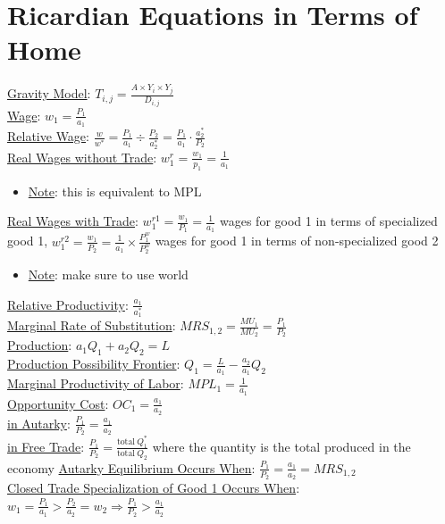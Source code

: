\documentclass{article}
\begin{document}
\section{Ricardian Equations in Terms of Home}
\underline{Gravity Model}: $T_{i,j} = \frac{A \times Y_{i} \times Y_{j}}{D_{i,j}}$ \\
\underline{Wage}: $w_{1} = \frac{P_{1}}{a_{1}}$ \\
\underline{Relative Wage}: $\frac{w}{w^{*}} = \frac{P_{1}}{a_{1}} \div \frac{P_{2}}{a_{2}^{*}} = \frac{P_{1}}{a_{1}} \cdot  \frac{a_{2}^{*}}{P_{2}}$ \\
\underline{Real Wages without Trade}: $w_{1}^{r} = \frac{w_{1}}{p_{1}} = \frac{1}{a_{1}}$
\begin{itemize}
  \item  \underline{Note}: this is equivalent to MPL
\end{itemize}
\underline{Real Wages with Trade}: $w_{1}^{r1} = \frac{w_{1}}{P_{1}} = \frac{1}{a_{1}}$ wages for good 1 in terms of specialized good 1, $w_{1}^{r2} = \frac{w_{1}}{P_{2}} = \frac{1}{a_{1}} \times \frac{P_{1}^{w}}{P_{2}^{w}}$ wages for good 1 in terms of non-specialized good 2 \\
\begin{itemize}
  \item  \underline{Note}: make sure to use world
\end{itemize}
\underline{Relative Productivity}: $\frac{a_{1}}{a_{1}^{*}}$ \\
\underline{Marginal Rate of Substitution}: $MRS_{1,2} = \frac{MU_{1}}{MU_{2}} = \frac{P_{1}}{P_{2}}$ \\
\underline{Production}: $a_{1}Q_{1} + a_{2}Q_{2} = L$ \\
\underline{Production Possibility Frontier}: $Q_{1} = \frac{L}{a_{1}} - \frac{a_{2}}{a_{1}}Q_{2}$ \\
\underline{Marginal Productivity of Labor}: $MPL_{1} = \frac{1}{a_{1}}$ \\
\underline{Opportunity Cost}: $OC_{1} = \frac{a_{1}}{a_{2}}$ \\
\underline{ in Autarky}: $\frac{P_{1}}{P_{2}} = \frac{a_{1}}{a_{2}}$ \\
\underline{ in Free Trade}: $\frac{P_{1}}{P_{2}} = \frac{\text{total} \ Q_{1}^{*}}{\text{total} \ Q_{2}}$ where the quantity is the total produced in the economy
\underline{Autarky Equilibrium Occurs When}: $\frac{P_{1}}{P_{2}} = \frac{a_{1}}{a_{2}} = MRS_{1,2}$ \\
\underline{Closed Trade Specialization of Good 1 Occurs When}: $w_{1} = \frac{P_{1}}{a_{1}} > \frac{P_{2}}{a_{2}} = w_{2} \Rightarrow \frac{P_{1}}{P_{2}} > \frac{a_{1}}{a_{2}}$ \\
\end{document}
